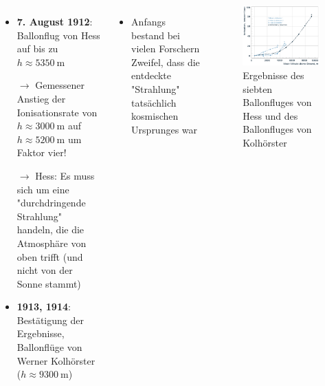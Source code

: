\documentclass[aspectratio=1610, professionalfonts, 9pt, hyperref={colorlinks=false}]{beamer}
\begin{document}
\begin{frame}{}
  \begin{columns}
      \begin{itemize}
        \setlength\itemsep{0.5em}
        \item \textbf{7. August 1912}: Ballonflug von Hess auf bis zu $h \approx \SI{5350}{\metre}$
        \item [$\rightarrow$] Gemessener Anstieg der Ionisationsrate von $h \approx \SI{3000}{\metre}$ auf $h \approx \SI{5200}{\metre}$ um Faktor vier!
        \item [$\rightarrow$] Hess: Es muss sich um eine "durchdringende Strahlung" handeln, die die Atmosphäre von oben trifft (und nicht von der Sonne stammt)
        \item \textbf{1913, 1914}: Bestätigung der Ergebnisse, Ballonflüge von Werner Kolhörster ($h \approx \SI{9300}{\metre}$)
      \end{itemize}


      \begin{itemize}
        \item Anfangs bestand bei vielen Forschern Zweifel, dass die entdeckte "Strahlung" tatsächlich kosmischen Ursprunges war
      \end{itemize}


      \begin{figure}
          \centering
          \includegraphics[width=\linewidth]{images/walter2.png}
          \caption{Ergebnisse des siebten Ballonfluges von Hess und des Ballonfluges von Kolhörster \cite{Hess:2018twh}}
      \end{figure}
  \end{columns}
\end{frame}
\end{document}
